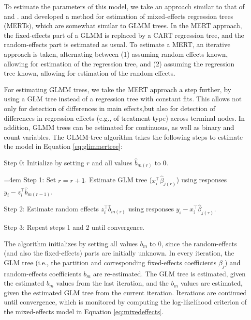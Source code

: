 \documentclass[nobf,doc]{apa}
\begin{document}
To estimate the parameters of this model, we take an approach similar to that of  and .  and  developed a method for estimation of mixed-effects regression trees (MERTs), which are somewhat similar to GLMM trees. In the MERT approach, the fixed-effects part of a GLMM is replaced by a CART regression tree, and the random-effects part is estimated as usual. To estimate a MERT, an iterative approach is taken, alternating between (1) assuming random effects known, allowing for estimation of the regression tree, and (2) assuming the regression tree known, allowing for estimation of the random effects. 

For estimating GLMM trees, we take the MERT approach a step further, by using a GLM tree instead of a regression tree with constant fits. This allows not only for detection of differences in main effects,but also for detection of differences in regression effects (e.g., of treatment type) across terminal nodes. In addition, GLMM trees can be estimated for continuous, as well as binary and count variables. The GLMM-tree algorithm takes the following steps to estimate the model in Equation \ref{eq:glimmertree}:

\vspace{5pt}
\noindent Step 0: Initialize by setting $r$ and all values $\hat{b}_{m(r)}$ to 0.

\vspace{5pt}
\noindent \hangindent=4em Step 1: Set $r = r+1$. Estimate GLM tree ($x_{i}^{\top}\hat{\beta}_{j(r)}$) using responses $y_i - z_{i}^{\top}\hat{b}_{m(r-1)}$.

\vspace{5pt}
\noindent Step 2: Estimate random effects $z_{i}^{\top}\hat{b}_{m(r)}$ using responses $y_i - x_{i}^{\top}\hat{\beta}_{j(r)}$.

\vspace{5pt}
\noindent Step 3: Repeat steps 1 and 2 until convergence.

\vspace{5pt}
The algorithm initializes by setting all values $b_m$ to $0$, since the random-effects (and also the fixed-effects) parts are initially unknown. In every iteration, the GLM tree (i.e., the partition and corresponding fixed-effects coefficients $\beta_j$) and random-effects coefficients $b_m$ are re-estimated. The GLM tree is estimated, given the estimated $b_m$ values from the last iteration, and the $b_m$ values are estimated, given the estimated GLM tree from the current iteration. Iterations are continued until convergence, which is monitored by computing the log-likelihood criterion of the mixed-effects model in Equation \ref{eq:mixedeffects}. 
\end{document}
